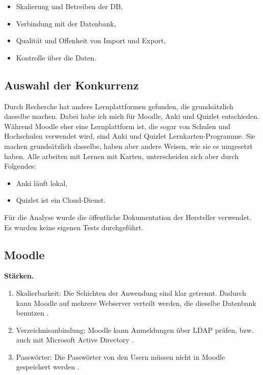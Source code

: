 \begin{itemize}
  \item Skalierung und Betreiben der DB,
  \item Verbindung mit der Datenbank,
  \item Qualität und Offenheit von Import und Export,
  \item Kontrolle über die Daten.
\end{itemize}
 
\subsection{Auswahl der Konkurrenz}
 
Durch Recherche hat \Jai andere Lernplattformen gefunden, die grundsätzlich dasselbe machen. Dabei habe ich mich für Moodle, Anki und Quizlet entschieden. Während Moodle eher eine Lernplattform ist, die sogar von Schulen und Hochschulen verwendet wird, sind Anki und Quizlet Lernkarten-Programme. Sie machen grundsätzlich dasselbe, haben aber andere Weisen, wie sie es umgesetzt haben. Alle arbeiten mit Lernen mit Karten, unterscheiden sich aber durch Folgendes:
 
\begin{itemize}
  \item Anki läuft lokal,
  \item Quizlet ist ein Cloud-Dienst.
\end{itemize}
 
Für die Analyse wurde die öffentliche Dokumentation der Hersteller verwendet. Es wurden keine eigenen Tests durchgeführt.
 
\subsection{Moodle}
 
\textbf{Stärken.}
\begin{enumerate}
  \item Skalierbarkeit: Die Schichten der Anwendung sind klar getrennt. Dadurch kann Moodle auf mehrere Webserver verteilt werden, die dieselbe Datenbank benutzen \parencite{moodle-performance}.
  \item Verzeichnisanbindung: Moodle kann Anmeldungen über LDAP prüfen, bzw. auch mit Microsoft Active Directory \parencite{moodle-ldap}.
  \item Passwörter: Die Passwörter von den Usern müssen nicht in Moodle gespeichert werden \parencite{moodle-ldap}.
\end{enumerate}
 

